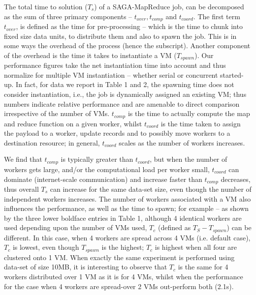 \documentclass[conference,final]{IEEEtran}
\newcommand{\sagamapreduce }{SAGA-MapReduce }
\begin{document}
The total time to solution ($T_s$) of a \sagamapreduce job, can be
decomposed as the sum of three primary components -- $t_{over},
t_{comp}$ and $t_{coord}$.  The first term $t_{over}$, is defined as
the time for pre-processing -- which is the time to chunk into fixed
size data units, to distribute them and also to spawn the job. This is
in some ways the overhead of the process (hence the subscript).
Another component of the overhead is the time it takes to instantiate
a VM ($T_{spawn}$).
Our performance figures take the net instantiation time into account
and thus normalize for multiple VM instantiation -- whether serial or
concurrent started-up. In fact, for data we report in Table 1 and 2,
the spawning time does not consider instantiation, i.e., the job is
dynamically assigned an existing VM; thus numbers indicate relative
performance and are amenable to direct comparison irrespective of the
number of VMs.  $t_{comp}$ is the time to actually compute the map and
reduce function on a given worker, whilst $t_{coord}$ is the time
taken to assign the payload to a worker, update records and to
possibly move workers to a destination resource; in general,
$t_{coord}$ scales as the number of workers increases.

We find that $t_{comp}$ is typically greater than $t_{coord}$, but
when the number of workers gets large, and/or the computational load
per worker small, $t_{coord}$ can dominate (internet-scale
communication) and increase faster than $t_{comp}$ decreases, thus
overall $T_s$ can increase for the same data-set size, even though the
number of independent workers increases.  The number of workers
associated with a VM also influences the performance, as well as the
time to spawn; for example -- as shown by the three lower boldface
entries in Table 1, although 4 identical workers are used depending
upon the number of VMs used, $T_c$ (defined as $T_S - T_{spawn} $) can
be different.  In this case, when 4 workers are spread across 4 VMs
(i.e. default case), $T_c$ is lowest, even though $T_{spawn}$ is the
highest; $T_c$ is highest when all four are clustered onto 1 VM. When
exactly the same experiment is performed using data-set of size 10MB,
it is interesting to observe that $T_c$ is the same for 4 workers
distributed over 1 VM as it is for 4 VMs, whilst when the performance
for the case when  4 workers are spread-over 2 VMs out-perform both (2.1s).
\end{document}
